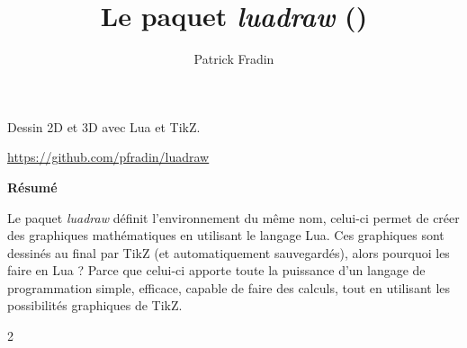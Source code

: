 \documentclass[%
10pt,%
oneside,
a4paper,%
french,%
notitlepage
]%
{book}%
\title{\textbf{Le paquet \emph{luadraw} (\version)}}
\author{Patrick Fradin}
\newcommand*{\luadrawenv}{\emph{luadraw}\xspace}%
\begin{document}
\maketitle

\hfil{\Large Dessin 2D et 3D avec Lua et TikZ.}\hfil\par
\hfil{\small \url{https://github.com/pfradin/luadraw}}\hfil\par

\vspace*{2cm} 

\begin{small}
\hfil\textbf{Résumé}\hfil\par
Le paquet \luadrawenv définit l'environnement du même nom, celui-ci permet de créer des graphiques mathématiques en utilisant le langage Lua. Ces graphiques sont dessinés au final par TikZ (et automatiquement sauvegardés), alors pourquoi les faire en Lua ? Parce que celui-ci apporte toute la puissance d'un langage de programmation simple, efficace, capable de faire des calculs, tout en utilisant les possibilités graphiques de TikZ.
\end{small}%


\clearpage%
\setcounter{tocdepth}{3}%
\setcounter{secnumdepth}{2}%

\begin{multicols}{2}
\tableofcontents
\end{multicols}

\listoffigures

\renewcommand{\labelitemi}{$\bullet$}
\renewcommand{\labelitemii}{--}
\renewcommand{\labelitemiii}{$*$}
\renewcommand{\thesection}{\Roman{section}~}
\renewcommand{\thesubsection}{\arabic{subsection})}
\renewcommand{\thesubsubsection}{\arabic{subsection}.\arabic{subsubsection}}
\renewcommand{\thefigure}{\arabic{figure}}




\end{document}
